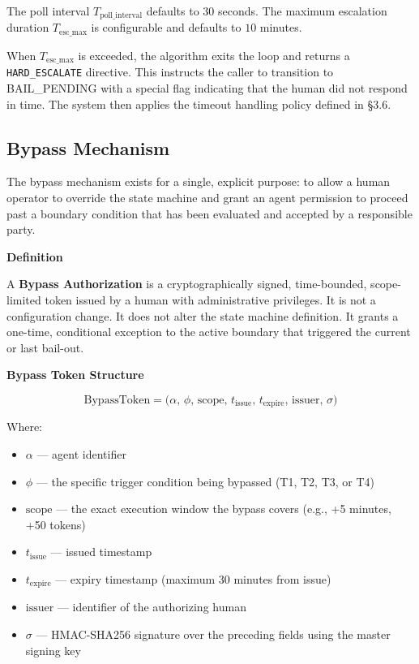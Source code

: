 The poll interval $T_{\text{poll\_interval}}$ defaults to $30$ seconds. The maximum escalation duration $T_{\text{esc\_max}}$ is configurable and defaults to $10$ minutes.

When $T_{\text{esc\_max}}$ is exceeded, the algorithm exits the loop and returns a \texttt{HARD\_ESCALATE} directive. This instructs the caller to transition to BAIL\_PENDING with a special flag indicating that the human did not respond in time. The system then applies the timeout handling policy defined in \S3.6.


\subsection{Bypass Mechanism}

The bypass mechanism exists for a single, explicit purpose: to allow a human operator to override the state machine and grant an agent permission to proceed past a boundary condition that has been evaluated and accepted by a responsible party.

\bigskip
\noindent\textbf{Definition}

A \textbf{Bypass Authorization} is a cryptographically signed, time-bounded, scope-limited token issued by a human with administrative privileges. It is not a configuration change. It does not alter the state machine definition. It grants a one-time, conditional exception to the active boundary that triggered the current or last bail-out.

\bigskip
\noindent\textbf{Bypass Token Structure}

\begin{equation}
\text{BypassToken} = \bigl(\alpha,\, \phi,\, \text{scope},\, t_{\text{issue}},\, t_{\text{expire}},\, \text{issuer},\, \sigma\bigr)
\end{equation}

Where:
\begin{itemize}
  \itemsep0em
  \item $\alpha$ — agent identifier
  \item $\phi$ — the specific trigger condition being bypassed (T1, T2, T3, or T4)
  \item $\text{scope}$ — the exact execution window the bypass covers (e.g., +5 minutes, +50 tokens)
  \item $t_{\text{issue}}$ — issued timestamp
  \item $t_{\text{expire}}$ — expiry timestamp (maximum 30 minutes from issue)
  \item $\text{issuer}$ — identifier of the authorizing human
  \item $\sigma$ — HMAC-SHA256 signature over the preceding fields using the master signing key
\end{itemize}

